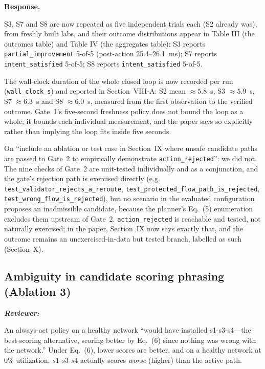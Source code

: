 \documentclass[11pt,a4paper]{article}
\newenvironment{reviewer}{\par\medskip\noindent\begin{minipage}{\linewidth}\small\itshape\color{quote}\textbf{Reviewer:}\par}{\end{minipage}\medskip\par}
\newenvironment{response}{\par\noindent\begin{minipage}{\linewidth}\small\textbf{Response.}\par}{\end{minipage}\medskip\par}
\begin{document}
\begin{response}
S3, S7 and S8 are now repeated as five independent trials each (S2 already
was), from freshly built labs, and their outcome distributions appear in
Table III (the outcomes table) and Table IV (the aggregates table): S3 reports
\texttt{partial\_improvement} 5-of-5 (post-action 25.4--26.1~ms); S7
reports \texttt{intent\_satisfied} 5-of-5; S8 reports
\texttt{intent\_satisfied} 5-of-5.

The wall-clock duration of the whole closed loop is now recorded per run
(\texttt{wall\_clock\_s}) and reported in Section~VIII-A: S2 mean
$\approx 5.8$~s, S3 $\approx 5.9$~s, S7 $\approx 6.3$~s and S8 $\approx 6.0$~s,
measured from the first observation to the verified outcome. Gate~1's five-second
freshness policy does not bound the loop as a whole; it bounds each
individual measurement, and the paper says so explicitly rather than
implying the loop fits inside five seconds.

On ``include an ablation or test case in Section~IX where unsafe candidate
paths are passed to Gate~2 to empirically demonstrate
\texttt{action\_rejected}'': we did not. The nine checks of Gate~2 are
unit-tested individually and as a conjunction, and the gate's rejection path
is exercised directly (e.g. \texttt{test\_validator\_rejects\_a\_reroute},
\texttt{test\_protected\_flow\_path\_is\_rejected},
\texttt{test\_wrong\_flow\_is\_rejected}), but no
scenario in the evaluated configuration proposes an inadmissible candidate,
because the planner's Eq.~(5) enumeration excludes them upstream of Gate~2.
\texttt{action\_rejected} is reachable and tested, not naturally exercised;
in the paper, Section~IX now says exactly that, and the outcome remains an
unexercised-in-data but tested branch, labelled as such (Section~X).
\end{response}

\subsection{Ambiguity in candidate scoring phrasing (Ablation 3)}

\begin{reviewer}
An always-act policy on a healthy network ``would have installed
s1-s3-s4---the best-scoring alternative, scoring better by Eq.~(6) since
nothing was wrong with the network.'' Under Eq.~(6), lower scores are
better, and on a healthy network at $0\%$ utilization, $s1$-$s3$-$s4$
actually scores \emph{worse} (higher) than the active path.
\end{reviewer}
\end{document}

